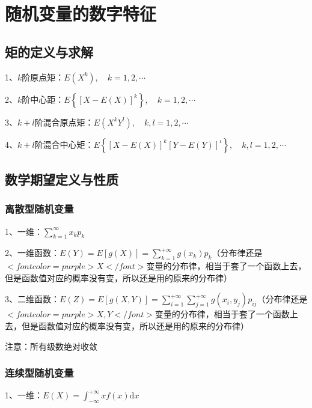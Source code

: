 \chapter{随机变量的数字特征}

\section{矩的定义与求解}

1、$ k $阶原点矩：$ E\left(X^{k}\right), \quad k=1,2, \cdots  $

2、$ k $阶中心距：$ E\left\{[X-E(X)]^{k}\right\}, \quad k=1,2, \cdots $

3、$ k+l $阶混合原点矩：$ E\left(X^{k} Y^{l}\right), \quad k, l=1,2, \cdots $

4、$ k+l $阶混合中心矩：$ E\left\{[X-E(X)]^{k}[Y-E(Y)]^{\iota}\right\}, \quad k, l=1,2, \cdots $

\section{数学期望定义与性质}



\subsection{离散型随机变量}

1、一维：$ \sum_{k=1}^{\infty}x_kp_k $

2、一维函数：$ E(Y)=E[g(X)]=\sum_{k=1}^{+\infty} g\left(x_{k}\right) p_{k} $（分布律还是$ <font color=purple>X</font> $变量的分布律，相当于套了一个函数上去，但是函数值对应的概率没有变，所以还是用的原来的分布律）

3、二维函数：$ E(Z)=E[g(X, Y)]=\sum_{i=1}^{+\infty} \sum_{j=1}^{+\infty} g\left(x_{i}, y_{j}\right) p_{i j} $（分布律还是$ <font color=purple>X,Y</font> $变量的分布律，相当于套了一个函数上去，但是函数值对应的概率没有变，所以还是用的原来的分布律）

注意：所有级数绝对收敛



\subsection{连续型随机变量}

1、一维：$ E(X)=\int_{-\infty}^{+\infty} x f(x) \mathrm{d} x $

